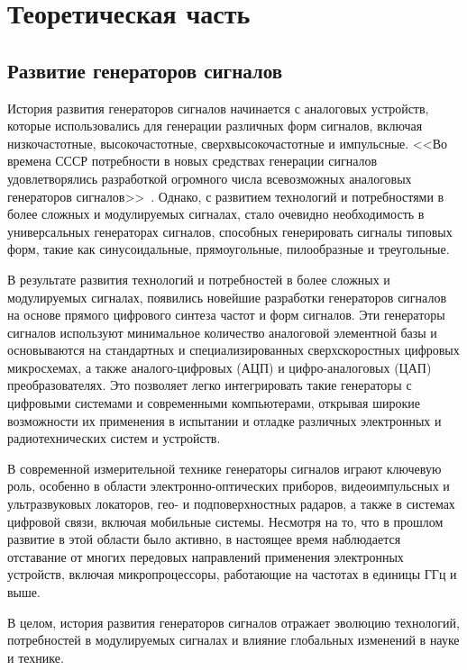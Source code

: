 \chapter{Теоретическая часть}

\section{Развитие генераторов сигналов}
История развития генераторов сигналов начинается с аналоговых устройств, которые
использовались для генерации различных форм сигналов, включая низкочастотные,
высокочастотные, сверхвысокочастотные и импульсные. <<Во времена СССР потребности в новых средствах генерации сигналов удовлетворялись разработкой огромного числа всевозможных аналоговых генераторов сигналов>>~\cite{dgs}. Однако, с развитием технологий и потребностями в более сложных и модулируемых сигналах, стало очевидно необходимость в универсальных генераторах сигналов, способных генерировать сигналы типовых форм, такие как синусоидальные, прямоугольные, пилообразные и треугольные.

В результате развития технологий и потребностей в более сложных и модулируемых
сигналах, появились новейшие разработки генераторов сигналов на основе прямого
цифрового синтеза частот и форм сигналов. Эти генераторы сигналов используют минимальное количество аналоговой элементной базы и основываются на стандартных и
специализированных сверхскоростных цифровых микросхемах, а также аналого-цифровых (АЦП) и цифро-аналоговых (ЦАП) преобразователях. Это позволяет легко интегрировать такие генераторы с цифровыми системами и современными компьютерами, открывая широкие возможности их применения в испытании и отладке различных электронных и радиотехнических систем и устройств. 

В современной измерительной технике генераторы сигналов играют ключевую роль, особенно в области электронно-оптических приборов, видеоимпульсных и ультразвуковых локаторов, гео- и подповерхностных радаров, а также в системах цифровой связи, включая мобильные системы. Несмотря на то, что в прошлом развитие в этой области было активно, в настоящее время наблюдается отставание от многих передовых направлений применения электронных устройств, включая микропроцессоры, работающие на частотах в единицы ГГц и выше. 

В целом, история развития генераторов сигналов отражает эволюцию технологий, потребностей в модулируемых сигналах и влияние глобальных изменений в науке и технике.


